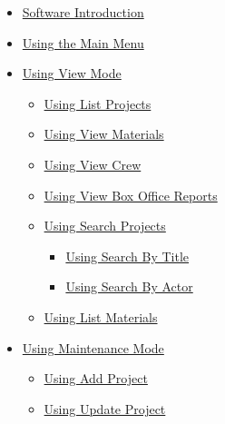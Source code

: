 \documentclass[
  english,
  a4paper,
,tablecaptionabove
]{scrartcl}
\providecommand{\tightlist}{%
  \setlength{\itemsep}{0pt}\setlength{\parskip}{0pt}}
\begin{document}
\begin{itemize}
  \begin{itemize}
  \tightlist
  \item
    \protect\hyperlink{software-introduction}{Software Introduction}
  \item
    \protect\hyperlink{using-the-main-menu}{Using the Main Menu}
  \item
    \protect\hyperlink{using-view-mode}{Using View Mode}

    \begin{itemize}
    \tightlist
    \item
      \protect\hyperlink{using-list-projects}{Using List Projects}
    \item
      \protect\hyperlink{using-view-materials}{Using View Materials}
    \item
      \protect\hyperlink{using-view-crew}{Using View Crew}
    \item
      \protect\hyperlink{using-view-box-office-reports}{Using View Box
      Office Reports}
    \item
      \protect\hyperlink{using-search-projects}{Using Search Projects}

      \begin{itemize}
      \tightlist
      \item
        \protect\hyperlink{using-search-by-title}{Using Search By Title}
      \item
        \protect\hyperlink{using-search-by-actor}{Using Search By Actor}
      \end{itemize}
    \item
      \protect\hyperlink{using-list-materials}{Using List Materials}
    \end{itemize}
  \item
    \protect\hyperlink{using-maintenance-mode}{Using Maintenance Mode}

    \begin{itemize}
    \tightlist
    \item
      \protect\hyperlink{using-add-project}{Using Add Project}
    \item
      \protect\hyperlink{using-update-project}{Using Update Project}


\end{itemize}
\end{itemize}
\end{itemize}
\end{document}
